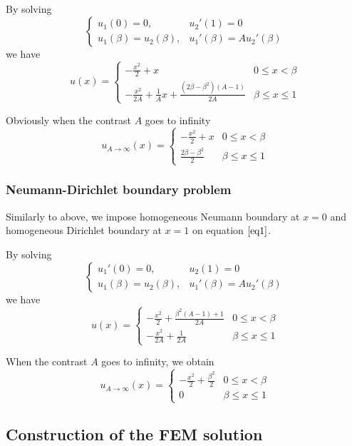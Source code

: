 \documentclass[12pt]{article}
\begin{document}
By solving
\[
\begin{cases}
u_{1}(0)=0, & u_{2}'(1)=0 \\
u_{1}(\beta)=u_{2}(\beta), & u_{1}'(\beta)=Au_{2}'(\beta)
\end{cases}
\]
we have
\[
u(x)=
\begin{cases}
-\frac{x^2}{2}+x & 0 \leq x < \beta \\
-\frac{x^2}{2A}+\frac{1}{A}x+\frac{(2\beta-\beta^2)(A-1)}{2A} & \beta \leq x \leq 1
\end{cases}
\]

Obviously when the contrast $A$ goes to infinity
\[
u_{A \to \infty}(x)=
\begin{cases}
-\frac{x^2}{2}+x & 0 \leq x < \beta \\
\frac{2\beta-\beta^2}{2} & \beta \leq x \leq 1
\end{cases}
\]

\subsubsection{Neumann-Dirichlet boundary problem}
Similarly to above, we impose homogeneous Neumann boundary at $x=0$ and homogeneous Dirichlet boundary at $x=1$ on equation $\ref{eq1}$.

By solving
\[
\begin{cases}
u_{1}'(0)=0, & u_{2}(1)=0 \\
u_{1}(\beta)=u_{2}(\beta), & u_{1}'(\beta)=Au_{2}'(\beta)
\end{cases}
\]
we have
\[
u(x)=
\begin{cases}
-\frac{x^2}{2}+\frac{\beta^2(A-1)+1}{2A} & 0 \leq x < \beta \\
-\frac{x^2}{2A}+\frac{1}{2A} & \beta \leq x \leq 1
\end{cases}
\]

When the contrast $A$ goes to infinity, we obtain
\[
u_{A \to \infty}(x)=
\begin{cases}
-\frac{x^2}{2}+\frac{\beta^2}{2} & 0 \leq x < \beta \\
0 & \beta \leq x \leq 1
\end{cases}
\]

\subsection{Construction of the FEM solution}
\end{document}
